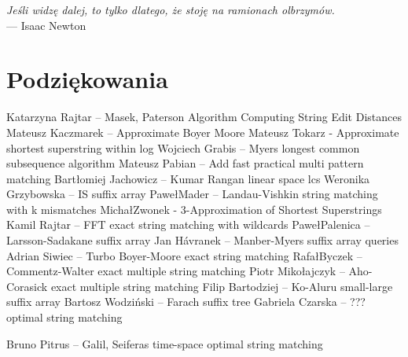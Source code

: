 
\begin{flushright}{\slshape    
Jeśli widzę dalej, to tylko dlatego,
że stoję na ramionach olbrzymów.} \\ \medskip
--- Isaac Newton
\end{flushright}

\bigskip

\begingroup

\let\clearpage\relax
\let\cleardoublepage\relax
\let\cleardoublepage\relax

\chapter*{Podziękowania}

\noindent
Katarzyna Rajtar -- Masek, Paterson Algorithm Computing String Edit Distances
Mateusz Kaczmarek -- Approximate Boyer Moore
Mateusz Tokarz - Approximate shortest superstring within log
Wojciech Grabis -- Myers longest common subsequence algorithm
Mateusz Pabian -- Add fast practical multi pattern matching
Bartłomiej Jachowicz -- Kumar Rangan linear space lcs
Weronika Grzybowska -- IS suffix array 
Pawe\l Mader -- Landau-Vishkin string matching with k mismatches
Micha\l Zwonek - 3-Approximation of Shortest Superstrings 
Kamil Rajtar -- FFT exact string matching with wildcards
Pawe\l Palenica -- Larsson-Sadakane suffix array
Jan H\'avranek -- Manber-Myers suffix array queries
Adrian Siwiec -- Turbo Boyer-Moore exact string matching
Rafa\l Byczek -- Commentz-Walter exact multiple string matching
Piotr Miko\l{}ajczyk -- Aho-Corasick exact multiple string matching
Filip Bartodziej -- Ko-Aluru small-large suffix array
Bartosz Wodzi\'nski -- Farach suffix tree
Gabriela Czarska -- ??? optimal string matching

Bruno Pitrus -- Galil, Seiferas time-space optimal string matching

\endgroup